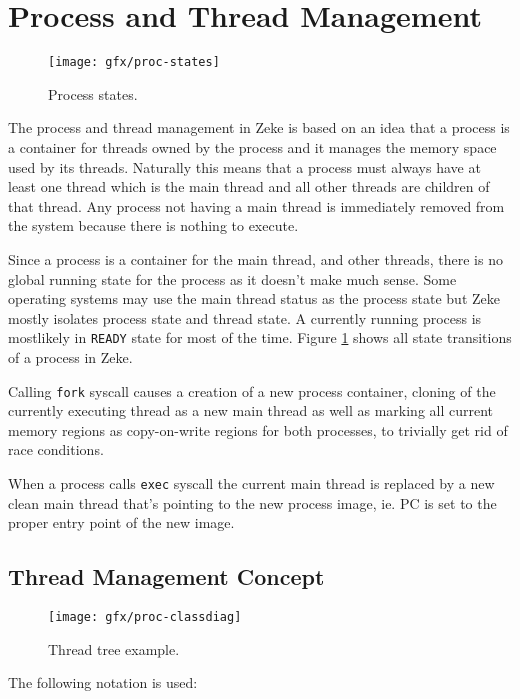 \part{Process and Thread Management}

\begin{figure}
  \center
  \texttt{[image: gfx/proc-states]}
  \caption{Process states.}
  \label{figure:procstates}
\end{figure}

The process and thread management in Zeke is based on an idea that
a process is a container for threads owned by the process and it manages
the memory space used by its threads. Naturally this means that a process
must always have at least one thread which is the main thread and all other
threads are children of that thread. Any process not having a main thread is
immediately removed from the system because there is nothing to execute.

Since a process is a container for the main thread, and other threads, there
is no global running state for the process as it doesn't make much sense.
Some operating systems may use the main thread status as the process state
but Zeke mostly isolates process state and thread state. A currently running
process is mostlikely in \verb+READY+ state for most of the time. Figure
\ref{figure:procstates} shows all state transitions of a process in Zeke.

Calling \verb+fork+ syscall causes a creation of a new process container,
cloning of the currently executing thread as a new main thread as well as
marking all current memory regions as copy-on-write regions for both processes,
to trivially get rid of race conditions.

When a process calls \verb+exec+ syscall the current main thread is replaced by
a new clean main thread that's pointing to the new process image, ie. \acs{PC}
is set to the proper entry point of the new image.

\chapter{Thread Management Concept}

\begin{figure}
  \center
  \texttt{[image: gfx/proc-classdiag]}
  \caption{Thread tree example.}
  \label{figure:thtree}
\end{figure}

The following notation is used:

